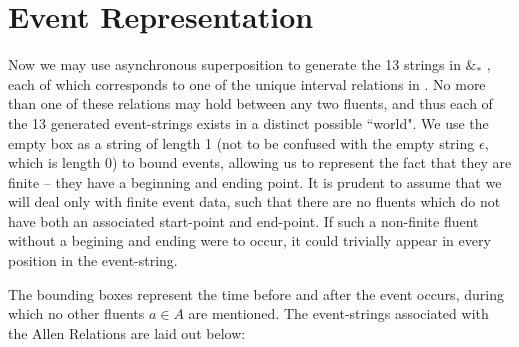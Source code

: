 \documentclass[a4paper,11pt,leqno]{article}
\newcommand{\vph}[1]{\vphantom{#1}}
\newcommand{\eboxl}[1]{\fbox{$\vph{'}#1$}}
\begin{document}
\section{Event Representation}\label{event rep}
Now we may use asynchronous superposition to generate the 13 strings in 
\eboxl{}\eboxl{e}\eboxl{} 
$\&_*$ 
\eboxl{}\eboxl{e'}\eboxl{}, each of which corresponds to one 
of the unique interval relations in \cite{allen1983maintaining}. No more than 
one of these relations may hold between any two fluents, and thus each of the 
13 generated event-strings exists in a distinct possible ``world".
We use the empty box \eboxl{} as a string of length 1 (not to be confused 
with the empty string $\epsilon$, which is length 0) to bound events, allowing 
us to represent the fact that they are finite -- they have a beginning and 
ending point. It is prudent to assume that we will deal only with finite event 
data, such that there are no fluents which do not have both an associated 
start-point and end-point. If such a non-finite fluent without a begining and 
ending were to occur, it could trivially appear in every position in the 
event-string. 

The bounding boxes represent the time 
before and after the event occurs, during which no other fluents $a \in A$ 
are mentioned. The 
event-strings associated with the Allen Relations are laid out 
below:
\end{document}
